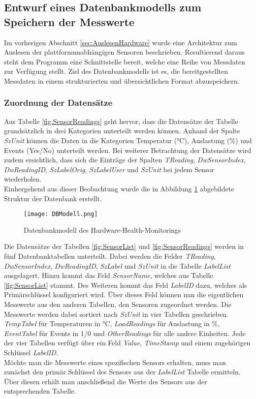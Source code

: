 \subsection{Entwurf eines Datenbankmodells zum Speichern der Messwerte}\label{sec:DatenbankModell}
Im vorherigen Abschnitt \ref{sec:AuslesenHardware} wurde eine Architektur zum Auslesen der plattformunabhängigen Sensoren beschrieben. Resultierend daraus steht dem Programm eine Schnittstelle bereit, welche eine Reihe von Messdaten zur Verfügung stellt. Ziel des Datenbankmodells ist es, die bereitgestellten Messdaten in einem strukturierten und übersichtlichen Format abzuspeichern.\\
\subsubsection*{Zuordnung der Datensätze}
Aus Tabelle \ref{fig:SensorReadings} geht hervor, dass die Datensätze der Tabelle grundsätzlich in drei Kategorien unterteilt werden können. Anhand der Spalte \textit{SzUnit} können die Daten in die Kategorien Temperatur (°C), Auslastung (\%) und Events (Yes/No) unterteilt werden. Bei weiterer Betrachtung der Datensätze wird zudem ersichtlich, dass sich die Einträge der Spalten \textit{TReading}, \textit{DwSensorIndex}, \textit{DwReadingID}, \textit{SzLabelOrig}, \textit{SzLabelUser} und \textit{SzUnit} bei jedem Sensor wiederholen.\\
Einhergehend aus dieser Beobachtung wurde die in Abbildung \ref{fig:DBModell} abgebildete Struktur der Datenbank erstellt. 
\begin{center}
    \begin{figure}[h!]
        \centering
        \texttt{[image: DBModell.png]}
        \caption{Datenbankmodell des Hardware-Health-Monitorings}
        \label{fig:DBModell}
    \end{figure}
\end{center}
\vspace{-1.8cm}
Die Datensätze der Tabellen \ref{fig:SensorList} und \ref{fig:SensorReadings} werden in fünf Datenbanktabellen unterteilt. Dabei werden die Felder \textit{TReading}, \textit{DwSensorIndex}, \textit{DwReadingID}, \textit{SzLabel} und \textit{SzUnit} in die Tabelle \textit{LabelList} ausgelagert. Hinzu kommt das Feld \textit{SensorName}, welches aus Tabelle \ref{fig:SensorList} stammt. Des Weiteren kommt das Feld \textit{LabelID} dazu, welches als Primärschlüssel konfiguriert wird. Über dieses Feld können nun die eigentlichen Messwerte aus den anderen Tabellen, den Sensoren zugeordnet werden. Die Messwerte werden dabei sortiert nach \textit{SzUnit} in vier Tabellen geschrieben. \textit{TempTabel} für Temperaturen in  °C, \textit{LoadReadings} für Auslastung in \%, \textit{EventTabel} für Events in 1/0 und \textit{OtherReadings} für alle andere Einheiten. Jede der vier Tabellen verfügt über ein Feld \textit{Value}, \textit{TimeStamp} und einem zugehörigen Schlüssel \textit{LabelID}.\\
Möchte man die Messwerte eines spezifischen Sensors erhalten, muss man zunächst den primär Schlüssel des Sensors aus der \textit{LabelList} Tabelle ermitteln. Über diesen erhält man anschließend die Werte des Sensors aus der entsprechenden Tabelle.
